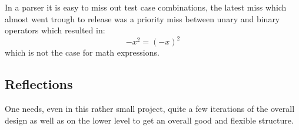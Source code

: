 \documentclass[a4paper,11pt]{kth-mag}
\begin{document}
        In a parser it is easy to miss out test case combinations, the latest miss
        which almost went trough to release was a priority miss between
        unary and binary operators which resulted in:
        \begin{equation*}
            -x^2=(-x)^2
        \end{equation*}
        which is not the case for math expressions.

    \subsection{Reflections}
        One needs, even in this rather small project, quite a few iterations 
        of the overall design as well as on the lower level to get an overall good and flexible
        structure.
\end{document}
